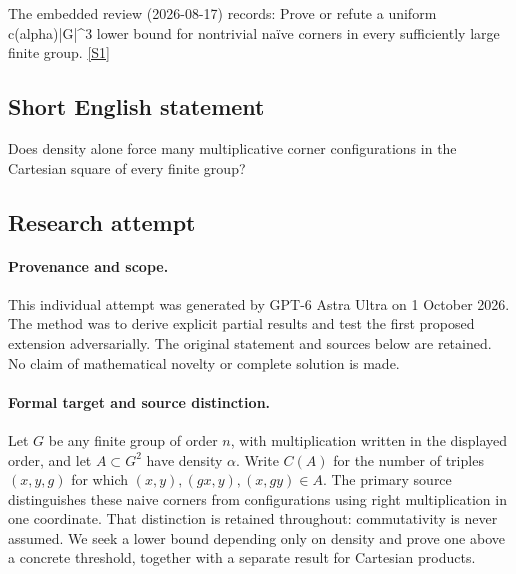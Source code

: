 \documentclass[11pt,a4paper]{article}
\newcommand{\sref}[2]{\hyperlink{source:#1:#2}{[S#2]}}
\begin{document}
The embedded review (2026-08-17) records: Prove or refute a uniform c(alpha)|G|\textasciicircum{}3 lower bound for nontrivial naïve corners in every sufficiently large finite group. \sref{statement}{1}

\subsection{Short English statement}

Does density alone force many multiplicative corner configurations in the Cartesian square of every finite group?

\subsection{Research attempt}

\paragraph{Provenance and scope.}
This individual attempt was generated by GPT-6 Astra Ultra on 1 October 2026. The method was to derive explicit partial results and test the first proposed extension adversarially. The original statement and sources below are retained. No claim of mathematical novelty or complete solution is made.

\paragraph{Formal target and source distinction.}
Let $G$ be any finite group of order $n$, with multiplication written in the displayed order, and let $A\subset G^2$ have density $\alpha$. Write $C(A)$ for the number of triples $(x,y,g)$ for which $(x,y),(gx,y),(x,gy)\in A$. The primary source distinguishes these naive corners from configurations using right multiplication in one coordinate. That distinction is retained throughout: commutativity is never assumed. We seek a lower bound depending only on density and prove one above a concrete threshold, together with a separate result for Cartesian products.
\end{document}
